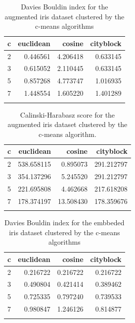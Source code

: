 \documentclass[conference]{IEEEtran}
\begin{document}
\begin{table}[ht!]
    \centering
    \begin{tabular}{lrrr}
\toprule
c &  euclidean &    cosine &  cityblock \\
\midrule
2 &   0.446561 &  4.206418 &   0.633145 \\
3 &   0.615052 &  2.110445 &   0.633145 \\
5 &   0.857268 &  4.773747 &   1.016935 \\
7 &   1.448554 &  1.605220 &   1.401289 \\
\bottomrule \\
\end{tabular}
    \caption{Davies Bouldin index for the augmented iris dataset clustered by the c-means algorithms}
    \label{tab:i2_db_c}
\end{table}

\begin{table}[ht!]
    \centering
    \begin{tabular}{lrrr}
\toprule
c &   euclidean &     cosine &   cityblock \\
\midrule
2 &  538.658115 &   0.895073 &  291.212797 \\
3 &  354.137296 &   5.245520 &  291.212797 \\
5 &  221.695808 &   4.462668 &  217.618208 \\
7 &  178.374197 &  13.508430 &  178.359676 \\
\bottomrule \\
\end{tabular}
    \caption{Calinski-Harabasz score for the augmented iris dataset clustered by the c-means algorithm.}
    \label{tab:i2_ch_c}
\end{table}

\begin{table}[ht!]
    \centering
    \begin{tabular}{lrrr}
\toprule
c &  euclidean &    cosine &  cityblock \\
\midrule
2 &   0.216722 &  0.216722 &   0.216722 \\
3 &   0.490804 &  0.421414 &   0.389462 \\
5 &   0.725335 &  0.797240 &   0.739533 \\
7 &   0.980847 &  1.246126 &   0.814877 \\
\bottomrule \\
\end{tabular}
    \caption{Davies Bouldin index for the embbeded iris dataset clustered by the c-means algorithms}
    \label{tab:ie_db_c}
\end{table}
\end{document}
